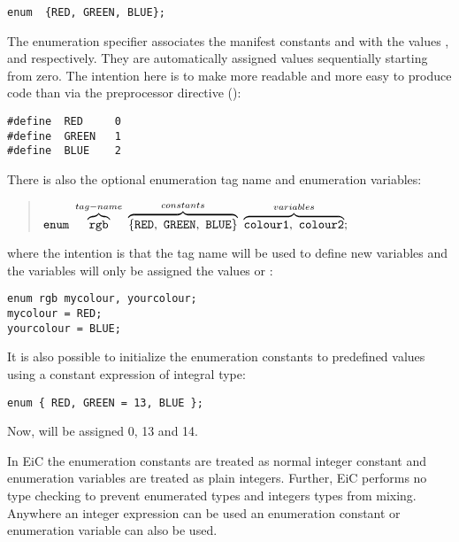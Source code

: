 \begin{production}
\begin{verbatim}
enum  {RED, GREEN, BLUE};
\end{verbatim}
\end{production}

The enumeration specifier associates the manifest constants  and  with the values , and 
respectively. They are automatically assigned values sequentially
starting from zero. The intention here is to make more readable and
more easy to produce code than via the preprocessor
 directive ({}):
\begin{production}
\begin{verbatim}
#define  RED     0
#define  GREEN   1
#define  BLUE    2
\end{verbatim}
\end{production}

There is also the optional enumeration tag name and enumeration variables:
\begin{quote}
        ${\tt enum}\ \overbrace{\tt rgb}^{tag-name}\ \overbrace{\T{\{RED,\ GREEN,\ BLUE\}}}^{constants}\ \overbrace{\T{colour1,\ colour2}}^{variables}; $
\end{quote}
 where the intention is that the tag name will be used to define new
variables and the variables will only be assigned the values  or :
\begin{production}
\begin{verbatim}
enum rgb mycolour, yourcolour;
mycolour = RED;
yourcolour = BLUE;
\end{verbatim}
\end{production}
 It is also possible to initialize the enumeration constants to
predefined values using a constant expression of integral type:
\begin{production}
\begin{verbatim} 
enum { RED, GREEN = 13, BLUE };
\end{verbatim}
\end{production}
 Now,  will be assigned 0,  13 and  14.

In EiC the enumeration constants are treated as normal integer
constant and enumeration variables are treated as plain
integers. Further, EiC performs no type checking to prevent
enumerated types and integers types from mixing. Anywhere an integer
expression can be used an enumeration constant or enumeration
variable can also be used.


